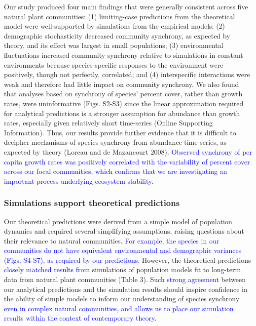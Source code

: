 \documentclass[12pt,]{article}
\begin{document}
Our study produced four main findings that were generally consistent
across five natural plant communities: (1) limiting-case predictions
from the theoretical model were well-supported by simulations from the
empirical models; (2) demographic stochasticity decreased community
synchrony, as expected by theory, and its effect was largest in small
populations; (3) environmental fluctuations increased community
synchrony relative to simulations in constant environments because
species-specific responses to the environment were positively, though
not perfectly, correlated; and (4) interspecific interactions were weak
and therefore had little impact on community synchrony. We also found
that analyses based on synchrony of species' percent cover, rather than
growth rates, were uninformative (Figs. S2-S3) since the linear
approximation required for analytical predictions is a stronger
assumption for abundance than growth rates, especially given relatively
short time-series (Online Supporting Information). Thus, our results
provide further evidence that it is difficult to decipher mechanisms of
species synchrony from abundance time series, as expected by theory
(Loreau and {{de Mazancourt}} 2008).
\textcolor{blue}{Observed synchrony of per capita growth rates was positively correlated with the variability of percent cover across our focal communities, which confirms that we are investigating an important process underlying ecosystem stability.}

\subsubsection{Simulations support theoretical
predictions}\label{simulations-support-theoretical-predictions}

Our theoretical predictions were derived from a simple model of
population dynamics and required several simplifying assumptions,
raising questions about their relevance to natural communities.
\textcolor{blue}{For example, the species in our communities do not have equivalent environmental and demographic variances (Figs. S4-S7), as required by our predictions.}
However, the theoretical predictions
\textcolor{blue}{closely matched results from} simulations of population
models fit to long-term data from natural plant communities (Table 3).
Such \textcolor{blue}{strong agreement} between our analytical
predictions and the simulation results should inspire confidence in the
ability of simple models to inform our understanding of species
synchrony
\textcolor{blue}{even in complex natural communities, and allows us to place our simulation results within the context of contemporary theory}.
\end{document}
